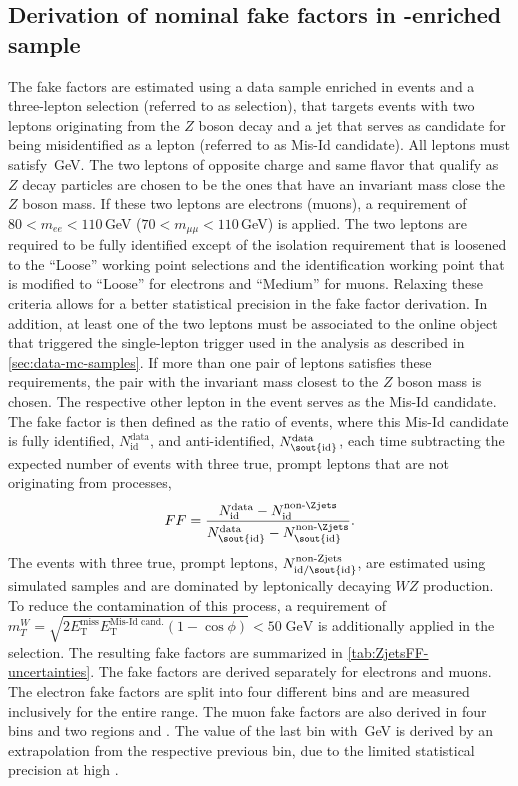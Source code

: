 \subsection{Derivation of nominal fake factors in \Zjets-enriched sample}
\label{subsubsec:zjets-ffs}
The fake factors are estimated using a data sample enriched in \Zjets events and a three-lepton selection (referred to as \Zjets selection), that targets events with two leptons originating from the $Z$ boson decay and a jet that serves as candidate for being misidentified as a lepton (referred to as Mis-Id candidate).
All leptons must satisfy \,GeV.
The two leptons of opposite charge and same flavor that qualify as $Z$ decay particles are chosen to be the ones that have an invariant mass close the $Z$ boson mass. If these two leptons are electrons (muons), a requirement of $80 < m_{ee} < 110\,$GeV ($70 < m_{\mu\mu} < 110\,$GeV) is applied.
The two leptons are required to be fully identified except of the isolation requirement that is loosened to the ``Loose'' working point selections and the identification working point that is modified to ``Loose'' for electrons and ``Medium'' for muons.
Relaxing these criteria allows for a better statistical precision in the fake factor derivation.
In addition, at least one of the two leptons must be associated to the online object that triggered the single-lepton trigger used in the analysis as described in \cref{sec:data-mc-samples}.
If more than one pair of leptons satisfies these requirements, the pair with the invariant mass closest to the $Z$ boson mass is chosen.
The respective other lepton in the event serves as the Mis-Id candidate.
The fake factor is then defined as the ratio of events, where this Mis-Id candidate is fully identified, $N_{\text{id}}^{\text{data}}$, and anti-identified, $N_{\text{\sout{id}}}^{\text{data}}$, each time subtracting the expected number of events with three true, prompt leptons that are not originating from \Zjets processes,
\begin{equation}
    \label{eq:ff}
    FF = \frac{ N_{\text{id}}^{\text{data}} - N_{\text{id}}^{\text{non-\Zjets}}}{N_{\text{\sout{id}}}^{\text{data}} - N_{\text{\sout{id}}}^{\text{non-\Zjets}}}.
\end{equation}
The events with three true, prompt leptons, $N_{\text{id/\sout{id}}}^{\text{non-Zjets}}$, are estimated using simulated samples and are dominated by leptonically decaying $WZ$ production.
To reduce the contamination of this process, a requirement of $m_T^W = \sqrt{2E^{\textrm{miss}}_\textrm{T} E^{\text{Mis-Id cand.}}_\textrm{T} (1-\cos\phi)} < 50\;\textrm{GeV}$ is additionally applied in the \Zjets selection.
The resulting fake factors are summarized in \cref{tab:ZjetsFF-uncertainties}.
The fake factors are derived separately for electrons and muons. The electron fake factors are split into four different \pT bins and are measured inclusively for the entire \abseta range.
The muon fake factors are also derived in four \pT bins and two \abseta regions  and . The value of the last \pT bin with \,GeV is derived by an extrapolation from the respective previous bin, due to the limited statistical precision at high \pT.

